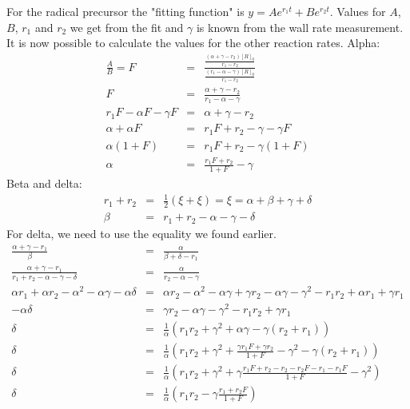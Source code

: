 \documentclass[10pt, a4paper]{article}
\begin{document}
For the radical precursor the "fitting function" is $ y = Ae^{r_1t} + Be^{r_2t}$. Values for $A$, $B$, $r_1$ and $r_2$ we get from the fit and $\gamma$ is known from the wall rate measurement. It is now possible to calculate the values for the other reaction rates. Alpha: 
\begin{eqnarray*}
\frac{A}{B} = F &=& \frac{ \frac{(\alpha + \gamma - r_2)[R]_0}{r_1 - r_2} }{ \frac{(r_1 - \alpha - \gamma)[R]_0}{r_1 - r_2} } \\
F &=& \frac{\alpha + \gamma - r_2}{r_1 - \alpha - \gamma} \\
r_1F - \alpha F - \gamma F &=& \alpha + \gamma - r_2 \\
\alpha + \alpha F &=& r_1F + r_2 - \gamma - \gamma F \\
\alpha(1 + F) &=& r_1F + r_2 - \gamma(1+F) \\
\alpha &=& \frac{r_1F + r_2}{1 + F} - \gamma 
\end{eqnarray*}
Beta and delta: 
\begin{eqnarray*}
r_1 + r_2 &=& \frac{1}{2}(\xi + \xi) = \xi = \alpha + \beta + \gamma + \delta \\
\beta &=& r_1 + r_2 - \alpha - \gamma -\delta 
\end{eqnarray*}
For delta, we need to use the equality we found earlier. 
\begin{eqnarray*}
\frac{\alpha + \gamma - r_1}{\beta} &=& \frac{\alpha}{\beta + \delta - r_1} \\
\frac{\alpha + \gamma - r_1}{r_1 + r_2 - \alpha - \gamma -\delta} &=& \frac{\alpha}{r_2 - \alpha - \gamma} \\
\alpha r_1 + \alpha r_2 -  \alpha^2 - \alpha \gamma - \alpha \delta &=& \alpha r_2 - \alpha^2 - \alpha \gamma + \gamma r_2 - \alpha \gamma - \gamma^2 - r_1 r_2 + \alpha r_1 + \gamma r_1        \\
-\alpha \delta &=&   \gamma r_2 - \alpha \gamma - \gamma^2 - r_1 r_2 + \gamma r_1  \\
\delta &=& \frac{1}{\alpha}\left(r_1 r_2 + \gamma^2 + \alpha \gamma - \gamma(r_2 + r_1) \right) \\
\delta &=& \frac{1}{\alpha}\left(r_1 r_2 + \gamma^2 + \frac{\gamma r_1F + \gamma r_2}{1 + F} - \gamma^2 - \gamma(r_2 + r_1) \right) \\
\delta &=& \frac{1}{\alpha}\left(r_1 r_2 + \gamma^2 + \gamma \frac{r_1F + r_2 - r_2 - r_2F - r_1 - r_1F}{1 + F} - \gamma^2  \right) \\
\delta &=& \frac{1}{\alpha}\left(r_1 r_2 - \gamma \frac{r_1 + r_2F}{1 + F}  \right) \\
\end{eqnarray*}
\end{document}
